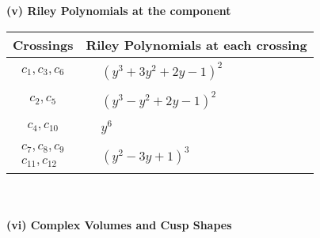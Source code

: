 \documentclass[1p]{elsarticle_modified}
\theoremstyle{definition}
\begin{document}
\newpage\renewcommand{\arraystretch}{1}
\flushleft \textbf{(v) Riley Polynomials at the component}\newline \\
\begin{tabular}{m{50pt}|m{274pt}}
Crossings & \hspace{64pt}Riley Polynomials at each crossing \\
\hline $$\begin{aligned}c_{1},c_{3},c_{6}\end{aligned}$$&$\begin{aligned}
&(y^3+3 y^2+2 y-1)^2
\end{aligned}$\\
\hline $$\begin{aligned}c_{2},c_{5}\end{aligned}$$&$\begin{aligned}
&(y^3- y^2+2 y-1)^2
\end{aligned}$\\
\hline $$\begin{aligned}c_{4},c_{10}\end{aligned}$$&$\begin{aligned}
&y^6
\end{aligned}$\\
\hline $$\begin{aligned}c_{7},c_{8},c_{9}\\c_{11},c_{12}\end{aligned}$$&$\begin{aligned}
&(y^2-3 y+1)^3
\end{aligned}$\\
\hline
\end{tabular}\\~\\
\newpage\flushleft \textbf{(vi) Complex Volumes and Cusp Shapes}
\end{document}
